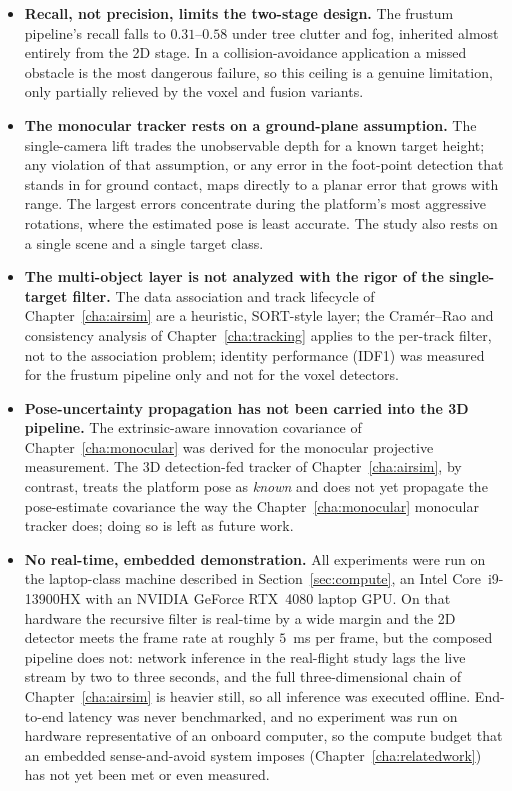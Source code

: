 \begin{itemize}
  uncertainty envelope therefore widens conservatively with the horizon. Since
  avoidance is fundamentally a decision about the \emph{future} conflict geometry
  and not about the present position, this is a real gap between what the
  perception layer delivers and what a complete detect-and-avoid function needs.
  \item \textbf{Recall, not precision, limits the two-stage design.} The frustum
  pipeline's recall falls to $0.31$--$0.58$ under tree clutter and fog, inherited
  almost entirely from the 2D stage. In a collision-avoidance application a missed
  obstacle is the most dangerous failure, so this ceiling is a genuine
  limitation, only partially relieved by the voxel and fusion variants.
  \item \textbf{The monocular tracker rests on a ground-plane assumption.} The
  single-camera lift trades the unobservable depth for a known target height; any
  violation of that assumption, or any error in the foot-point detection that
  stands in for ground contact, maps directly to a planar error that grows with
  range. The largest errors concentrate during the platform's most aggressive
  rotations, where the estimated pose is least accurate. The study also rests on a
  single scene and a single target class.
  \item \textbf{The multi-object layer is not analyzed with the rigor of the
  single-target filter.} The data association and track lifecycle of
  Chapter~\ref{cha:airsim} are a heuristic, SORT-style layer; the
  Cram\'er--Rao and consistency analysis of Chapter~\ref{cha:tracking} applies to
  the per-track filter, not to the association problem; identity performance
  (IDF1) was measured for the frustum pipeline only and not for the voxel
  detectors.
  \item \textbf{Pose-uncertainty propagation has not been carried into the 3D
  pipeline.} The extrinsic-aware innovation covariance of
  Chapter~\ref{cha:monocular} was derived for the monocular projective
  measurement. The 3D detection-fed tracker of Chapter~\ref{cha:airsim}, by
  contrast, treats the platform pose as \emph{known} and does not yet propagate
  the pose-estimate covariance the way the Chapter~\ref{cha:monocular} monocular
  tracker does; doing so is left as future work.
  \item \textbf{No real-time, embedded demonstration.} All experiments were run on
  the laptop-class machine described in Section~\ref{sec:compute}, an Intel
  Core~i9-13900HX with an NVIDIA GeForce RTX~4080 laptop GPU. On that hardware the recursive filter
  is real-time by a wide margin and the 2D detector meets the frame rate at
  roughly $5$~ms per frame, but the composed pipeline does not: network inference
  in the real-flight study lags the live stream by two to three seconds, and the
  full three-dimensional chain of Chapter~\ref{cha:airsim} is heavier still, so
  all inference was executed offline. End-to-end latency was never benchmarked,
  and no experiment was run on hardware representative of an onboard computer, so
  the compute budget that an embedded sense-and-avoid system imposes
  (Chapter~\ref{cha:relatedwork}) has not yet been met or even measured.
\end{itemize}

